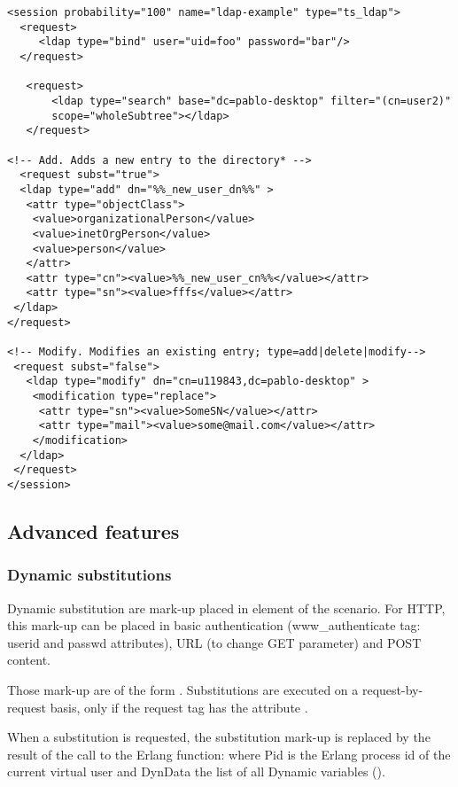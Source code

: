 \documentclass{TSUNG-en}
\begin{document}
\begin{Verbatim}
<session probability="100" name="ldap-example" type="ts_ldap">
  <request>
     <ldap type="bind" user="uid=foo" password="bar"/>
  </request>

   <request>
       <ldap type="search" base="dc=pablo-desktop" filter="(cn=user2)"
       scope="wholeSubtree"></ldap>
   </request>

<!-- Add. Adds a new entry to the directory* -->
  <request subst="true">
  <ldap type="add" dn="%%_new_user_dn%%" >
   <attr type="objectClass">
    <value>organizationalPerson</value>
    <value>inetOrgPerson</value>
    <value>person</value>
   </attr>
   <attr type="cn"><value>%%_new_user_cn%%</value></attr>
   <attr type="sn"><value>fffs</value></attr>
 </ldap>
</request>

<!-- Modify. Modifies an existing entry; type=add|delete|modify-->
 <request subst="false">
   <ldap type="modify" dn="cn=u119843,dc=pablo-desktop" >
    <modification type="replace">
     <attr type="sn"><value>SomeSN</value></attr>
     <attr type="mail"><value>some@mail.com</value></attr>
    </modification>
  </ldap>
 </request>
</session>
\end{Verbatim}

\subsection{Advanced features}

\subsubsection{Dynamic substitutions}

 Dynamic substitution are mark-up placed in element of the scenario.
For HTTP, this mark-up can be placed in basic authentication (www\_authenticate
tag: userid and passwd attributes), URL (to change GET parameter)
and POST content.

Those mark-up are of the form .
Substitutions are executed on a request-by-request basis, only if the
request tag has the attribute .

When a substitution is requested, the substitution mark-up is replaced by
the result of the call to the Erlang function:
 where Pid is the Erlang process
id of the current virtual user and DynData the list of all Dynamic
variables ().
\end{document}
